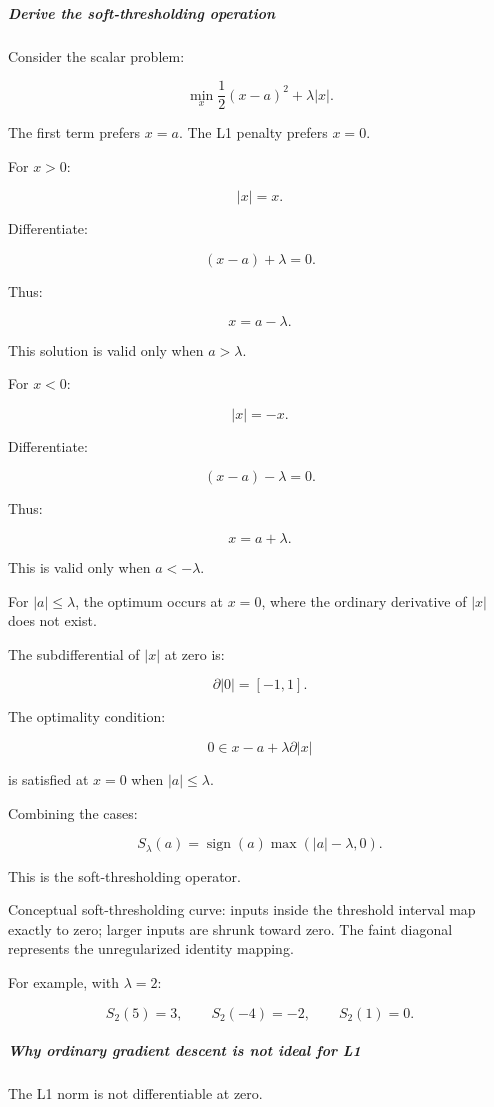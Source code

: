 \subparagraph{Derive the soft-thresholding operation}\label{derive-the-soft-thresholding-operation}

Consider the scalar problem:

\[
\min_x \frac12(x-a)^2+\lambda|x|.
\]

The first term prefers \(x=a\). The L1 penalty prefers \(x=0\).

For \(x>0\):

\[
|x|=x.
\]

Differentiate:

\[
(x-a)+\lambda=0.
\]

Thus:

\[
x=a-\lambda.
\]

This solution is valid only when \(a>\lambda\).

For \(x<0\):

\[
|x|=-x.
\]

Differentiate:

\[
(x-a)-\lambda=0.
\]

Thus:

\[
x=a+\lambda.
\]

This is valid only when \(a<-\lambda\).

For \(|a|\le\lambda\), the optimum occurs at \(x=0\), where the ordinary derivative of \(|x|\) does not exist.

The subdifferential of \(|x|\) at zero is:

\[
\partial|0|=[-1,1].
\]

The optimality condition:

\[
0\in x-a+\lambda\partial|x|
\]

is satisfied at \(x=0\) when \(|a|\le\lambda\).

Combining the cases:

\[
\boxed{ S_\lambda(a)= \operatorname{sign}(a) \max(|a|-\lambda,0) }.
\]

This is the soft-thresholding operator.

Conceptual soft-thresholding curve: inputs inside the threshold interval map exactly to zero; larger inputs are shrunk toward zero. The faint diagonal represents the unregularized identity mapping.

For example, with \(\lambda=2\):

\[
S_2(5)=3,\qquad S_2(-4)=-2,\qquad S_2(1)=0.
\]

\subparagraph{Why ordinary gradient descent is not ideal for L1}\label{why-ordinary-gradient-descent-is-not-ideal-for-l1}

The L1 norm is not differentiable at zero.

